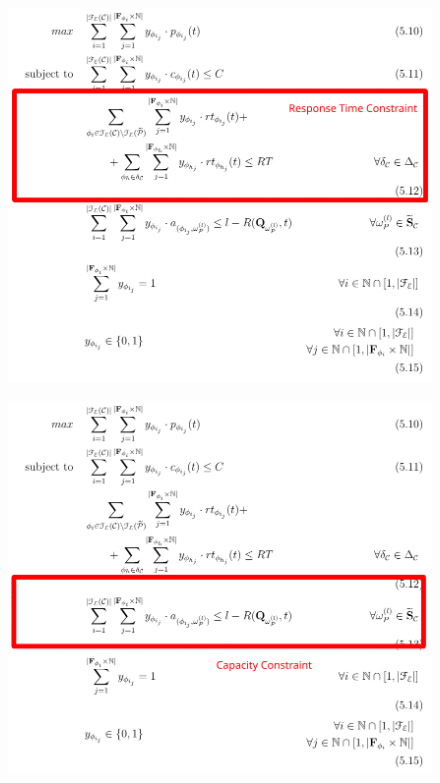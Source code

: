 \documentclass[13.5pt]{beamer}
\begin{document}
\begin{frame}[noframenumbering]
	
	\begin{figure}[h]
		\centering
		\includegraphics[width=\textwidth,height=0.8\columnwidth]{../Images/MMKPForSlide3.png}
	\end{figure}
	
	
\end{frame}



\begin{frame}[noframenumbering]
	
	\begin{figure}[h]
		\centering
		\includegraphics[width=\textwidth,height=0.8\columnwidth]{../Images/MMKPForSlide4.png}
	\end{figure}
	
	
\end{frame}
\end{document}
